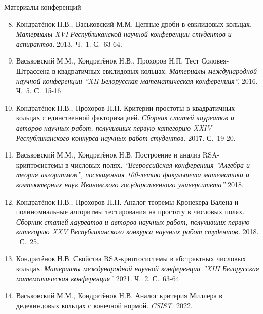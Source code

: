 \documentclass[8pt, xcolor=x11names]{beamer}
\begin{document}
\begin{frame}{Материалы конференций}
    \begin{small}
        \begin{enumerate}
            \setcounter{enumi}{7}

            \item Кондратёнок Н.В., Васьковский М.М. Цепные дроби в евклидовых кольцах. {\it Материалы XVI Республиканской научной конференции студентов и аспирантов.} 2013. Ч.~1. С.~63-64.
            
            \item Васьковский М.М., Кондратёнок Н.В., Прохоров Н.П. Тест Соловея-Штрассена в квадратичных евклидовых кольцах. {\it Материалы международной научной конференции ''XII Белорусская математическая конференция''.} 2016. Ч.~5. С.~15-16
            
            \item Кондратёнок Н.В., Прохоров Н.П. Критерии простоты в квадратичных кольцах с единственной факторизацией. {\it Сборник статей лауреатов и авторов научных работ, получивших первую категорию XXIV Республиканского конкурса научных работ студентов.} 2017. С.~19-20.
            
            \item Васьковский М.М., Кондратёнок Н.В. Построение и анализ RSA-криптосистемы в числовых полях. {\it ''Всероссийская конференция ''Алгебра и теория алгоритмов'', посвященная 100-летию факультета математики и компьютерных наук Ивановского государственного университета''} 2018.
            
            \item Кондратёнок Н.В., Прохоров Н.П. Аналог теоремы Кронекера-Валена и полиномиальные алгоритмы тестирования на простоту в числовых полях. {\it Сборник статей лауреатов и авторов научных работ, получивших первую категорию XXV Республиканского конкурса научных работ студентов.} 2018. \textendash\ С.~25.
    
            \item Кондратёнок Н.В. Свойства RSA-криптосистемы в абстрактных числовых кольцах. {\it Материалы международной научной конференции ''XIII Белорусская математическая конференция''} 2021. Ч.~2. С.~63-64

            \item Васьковский М.М., Кондратёнок Н.В. Аналог критерия Миллера в дедекиндовых кольцах с конечной нормой. {\it CSIST.} 2022.
        \end{enumerate}
    \end{small}
\end{frame}
\end{document}
